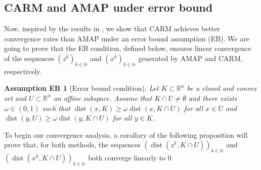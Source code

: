 \documentclass[smallextended,numbook,nospthms]{svjour3}
\theoremstyle{plain}
\newtheorem*{assumption}{Assumption EB}
\theoremstyle{definition}
\def\RR{\mathds R}
\def\NN{\mathds N}
\DeclareMathOperator{\dist}{dist}
\begin{document}
\subsection{CARM and AMAP under error bound}\label{subsec:comp EB}
Now, inspired by the results in \cite{Arefidamghani:2020}, we show that CARM achieves better convergence rates than AMAP under an error bound assumption (EB). We are going to prove that the EB condition, defined below, ensures linear convergence of the sequences $\left(z^{k}\right)_{k \in \NN}$ and $\left(x^{k}\right)_{k \in \NN}$ generated by AMAP and CARM, respectively.

\begin{assumption}[Error bound condition]\label{eb}
Let $K \subset \RR^{n}$ be a closed and convex set  and $U \subset \RR^{n}$ an affine subspace. Assume that $K \cap U \neq \emptyset$ and there exists $\omega \in(0,1)$ such that $\dist(x, K) \geq \omega \dist\left(x, K \cap U\right)$ for all $x \in U$ and $\dist(y, U) \geq \omega \dist\left(y, K \cap U\right)$ for all $y \in K$.
\end{assumption}

To begin our convergence analysis, a corollary of the following proposition will prove that, for both methods, the sequences $\left(\dist\left(z^{k}, K \cap U\right)\right)_{k \in \NN}$ and $\left(\dist\left(x^{k}, K \cap U\right)\right)_{k \in \NN}$ both converge linearly to $0$.
\end{document}
